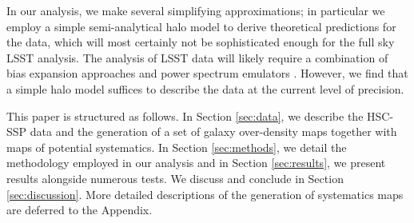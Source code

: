 \documentclass[a4paper,11pt]{article}
\begin{document}
  In our analysis, we make several simplifying approximations; in particular we employ a simple semi-analytical halo model to derive theoretical predictions for the data, which will most certainly not be sophisticated enough for the full sky LSST analysis. The analysis of LSST data will likely require  a combination of  bias expansion approaches \cite{0902.0991,1402.5916,1611.09787,1910.07097} and power spectrum emulators \cite{1804.05865,1705.03388}. However, we find that a simple halo model suffices to describe the data at the current level of precision.

  This paper is structured as follows. In Section \ref{sec:data}, we describe the HSC-SSP data and the generation of a set of galaxy over-density maps together with maps of potential systematics. In Section \ref{sec:methods}, we detail the methodology employed in our analysis and in Section \ref{sec:results}, we present results alongside numerous tests. We discuss and conclude in Section \ref{sec:discussion}. More detailed descriptions of the generation of systematics maps are deferred to the Appendix. 
\end{document}
